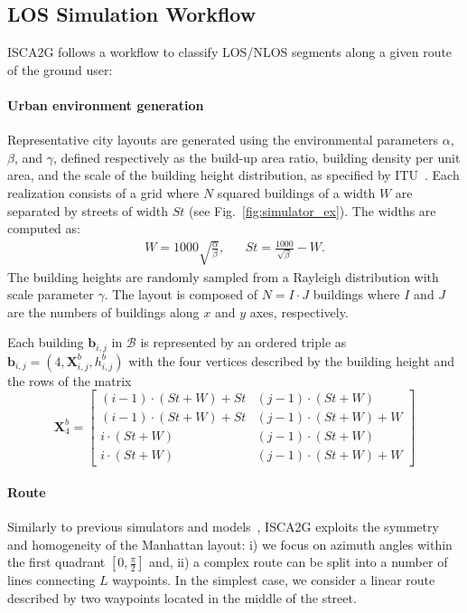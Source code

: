 \documentclass[10pt,conference]{IEEEtran}
\begin{document}
\subsection{LOS Simulation Workflow}
ISCA2G follows a workflow to classify LOS/NLOS segments along a given route of the ground user:
\paragraph{Urban environment generation} Representative city layouts are generated using the environmental parameters $\alpha$, $\beta$, and $\gamma$, defined respectively as the build-up area ratio, building density per unit area, and the scale of the building height distribution, as specified by ITU~\cite{ITU}. Each realization consists of a grid where $N$ squared buildings of a width ${W}$ are separated by streets of width $St$ (see Fig.~\ref{fig:simulator_ex}). The widths are computed as:
\begin{align}
W = 1000 \sqrt{\frac{\alpha}{\beta}}, && St = \frac{1000}{\sqrt{\beta}} - W.
\end{align}
The building heights are randomly sampled from a Rayleigh distribution with scale parameter $\gamma$. The layout is composed of $N=I\cdot J$ buildings where $I$ and $J$ are the numbers of buildings along $x$ and $y$ axes, respectively.  

Each building $\mathbf{b}_{i,j}$ in $\mathcal{B}$ is represented by an ordered triple as $\mathbf{b}_{i,j} = (4, \mathbf{X}_{i,j}^b
, h_{i,j}^b)$ with the four vertices described by the building height and the rows of the matrix 
\begin{equation}
\mathbf{X}_4^b = \begin{bmatrix}
(i-1)\cdot(St+W)+St & (j-1)\cdot(St+W)\\
(i-1)\cdot(St+W)+St & (j-1)\cdot(St+W)+W\\
i\cdot(St+W) & (j-1)\cdot(St+W)\\
i\cdot(St+W) & (j-1)\cdot(St+W)+W
\end{bmatrix}    
\end{equation}

\paragraph{Route}
Similarly to previous simulators and models~\cite{Saboor2023simulator,Saboor2024model,Saboor2025pedestrian}, ISCA2G exploits the symmetry and homogeneity of the Manhattan layout: i) we focus on azimuth angles within the first quadrant $[0,\frac{\pi}{2}]$ and, ii) a complex route can be split into a number of lines connecting $L$ waypoints. In the simplest case, we consider a linear route described by two waypoints located in the middle of the street.
    
\end{document}
